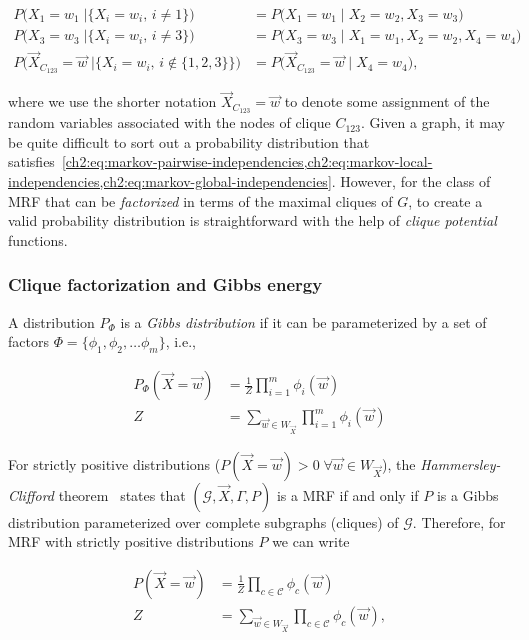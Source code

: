 \begin{align*}
		P\Big(X_1=w_1 \; | \big\{X_i=w_i, \, i \neq 1 \big\} \Big) &= P\Big(X_1=w_1 \; | \; X_2=w_2,X_3=w_3 \Big) \\
		P\Big(X_3=w_3 \; | \big\{X_i=w_i, \, i \neq 3 \big\} \Big) &= P\Big(X_3=w_3 \; | \; X_1=w_1,X_2=w_2, X_4=w_4 \Big) \\
		P\Big(\vec{X}_{C_{123}} = \vec{w} \; | \big\{X_i=w_i, \, i \notin \{1,2,3\}  \big\} \Big) &= P\Big(\vec{X}_{C_{123}} = \vec{w} \; | \; X_4=w_4 \Big),		
\end{align*}

where we use the shorter notation $\vec{X}_{C_{123}} = \vec{w} $ to denote some assignment of the random variables associated with the nodes of clique $C_{123}$. Given a graph, it may be quite difficult to sort out a probability distribution that satisfies~\cref{ch2:eq:markov-pairwise-independencies,ch2:eq:markov-local-independencies,ch2:eq:markov-global-independencies}. However, for the class of MRF that can be \emph{factorized} in terms of the maximal cliques of $G$, to create a valid probability distribution is straightforward with the help of \emph{clique potential} functions.

\subsubsection{Clique factorization and Gibbs energy}

A distribution $P_{\Phi}$ is a \emph{Gibbs distribution} if it can be parameterized by a set of factors $\Phi = \{\phi_1,\phi_2,\dots \phi_m\}$, i.e., 

\begin{align*}
	P_{\Phi}(\vec{X} = \vec{w}) &= \frac{1}{Z}\prod_{i=1}^{m}{\phi_i(\vec{w})} \\
	Z &= \sum_{\vec{w} \in W_{\vec{X}}}{ \prod_{i=1}^{m}{\phi_i(\vec{w})} }
\end{align*}


For strictly positive distributions ($P(\vec{X} = \vec{w}) > 0\; \forall \vec{w} \in W_{\vec{X}}$), the \emph{Hammersley-Clifford} theorem~\cite{koller09} states that $(\mathcal{G},\vec{X},\Gamma,P)$ is a MRF if and only if $P$ is a Gibbs distribution parameterized over complete subgraphs (cliques) of $\mathcal{G}$. Therefore, for MRF with strictly positive distributions $P$ we can write 

\begin{align}
	P(\vec{X} = \vec{w}) &= \frac{1}{Z}\prod_{c \in \mathcal{C}}{\phi_c(\vec{w})} \label{ch2:eq:gibbs-distribution}\\
	Z &=  \sum_{\vec{w} \in W_{\vec{X}}}{ \prod_{c \in \mathcal{C}}{\phi_c(\vec{w})} },\label{ch2:eq:gibbs-constant}
\end{align}

